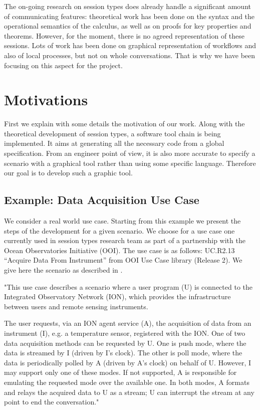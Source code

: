 \documentclass[a4paper,11pt,twoside]{report}
\begin{document}
The on-going research on session types does already handle a significant amount of communicating features: theoretical work has been done on the syntax and the operational semantics of the calculus, as well as on proofs for key properties and theorems. However, for the moment, there is no agreed representation of these sessions. Lots of work has been done on graphical representation of workflows and also of local processes, but not on whole conversations. That is why we have been focusing on this aspect for the project.


\section*{Motivations}
First we explain with some details the motivation of our work. Along with the theoretical development of session types, a software tool chain is being implemented. It aims at generating all the necessary code from a global specification. From an engineer point of view, it is also more accurate to specify a scenario with a graphical tool rather than using some specific language. Therefore our goal is to develop such a graphic tool.

\subsection*{Example: Data Acquisition Use Case}

We consider a real world use case. Starting from this example we present the steps of the development for a given scenario. We choose for a use case one currently used in session types research team as part of a partnership with the Ocean Observatories Initiative (OOI). The use case is as follows: UC.R2.13 “Acquire Data From Instrument” from OOI Use Case library (Release 2). We give here the scenario as described in \cite{bocchisafety}.

"This use case describes a scenario where a user program (U) is connected to the Integrated Observatory Network (ION), which provides the infrastructure between users and remote sensing instruments.

The user requests, via an ION agent service (A), the acquisition of data from an instrument (I), e.g. a temperature sensor, registered with the ION. One of two data acquisition methods can be requested by U. One is push mode, where the data is streamed by I (driven by I’s clock). The other is poll mode, where the data is periodically polled by A (driven by A’s clock) on behalf of U. However, I may support only one of these modes. If not supported, A is responsible for emulating the requested mode over the available one. In both modes, A formats and relays the acquired data to U as a stream; U can interrupt the stream at any point to end the conversation."
\end{document}
